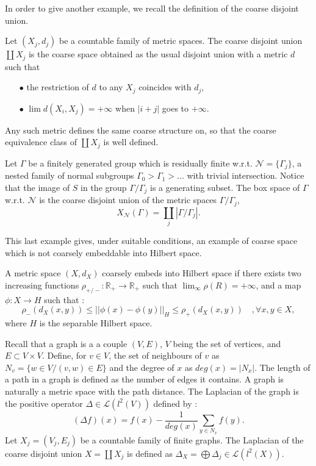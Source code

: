
In order to give another example, we recall the definition of the coarse disjoint union.

\begin{definition}
Let $(X_j,d_j)$ be a countable family of metric spaces. The coarse disjoint union $\coprod X_j$ is the coarse space obtained as the usual disjoint union with a metric $d$ such that 
\begin{itemize}
\item[$\bullet$] the restriction of $d$ to any $X_j$ coincides with $d_j$, 
\item[$\bullet$] $\lim d(X_i,X_j)= + \infty$ when $|i+j|$ goes to $+\infty$.
\end{itemize}
Any such metric defines the same coarse structure on, so that the coarse equivalence class of $\coprod X_j$ is well defined. 
\end{definition}

\begin{Expl}
Let $\Gamma$ be a finitely generated group which is residually finite w.r.t. $\mathcal N=\{\Gamma_j\}$, a nested family of normal subgroups $\Gamma_0 > \Gamma_1>...$ with trivial intersection. Notice that the image of $S$ in the group $\Gamma / \Gamma_j$ is a generating subset. The box space of $\Gamma$ w.r.t. $\mathcal N$ is the coarse disjoint union of the metric spaces $\Gamma/\Gamma_j$,
\[X_{\mathcal N}(\Gamma)=\coprod_j |\Gamma/\Gamma_j|.\]
\end{Expl}

This last example gives, under suitable conditions, an example of coarse space which is not coarsely embeddable into Hilbert space.

\begin{definition}
A metric space $(X,d_X)$ coarsely embeds into Hilbert space if there exists two increasing functions $\rho_{+/-}: \mathbb R_+\rightarrow \mathbb R_+$ such that $\lim_{\infty} \rho(R) = +\infty$, and a map $\phi : X\rightarrow H$ such that :
\[\rho_-(d_X(x,y))\leq ||\phi(x)-\phi(y)||_H \leq \rho_+(d_X(x,y))\quad,\forall x,y\in X,\]
where $H$ is the separable Hilbert space.\\
\end{definition}

Recall that a graph is a a couple $(V,E)$, $V$ being the set of vertices, and $E\subset V\times V$. Define, for $v\in V$, the set of neighbours of $v$ as $N_v=\{w\in V / (v,w)\in E\}$ and the degree of $x$ as $deg(x)=|N_x|$. The length of a path in a graph is defined as the number of edges it contains. A graph is naturally a metric space with the path distance. The Laplacian of the graph is the positive operator $\Delta \in\mathcal L(l^2(V))$ defined by :
\[(\Delta f) (x) = f(x) - \frac{1}{deg(x)}\sum_{y\in N_x} f(y) .\] 
Let $X_j = (V_j,E_j)$ be a countable family of finite graphs. The Laplacian of the coarse disjoint union $X=\coprod X_j$ is defined as $\Delta_X = \bigoplus \Delta_j \in \mathcal L(l^2(X))$.
 
